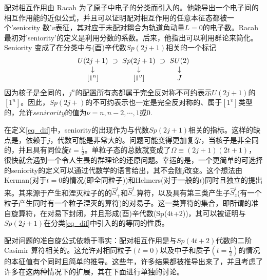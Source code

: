 配对相互作用由 Racah 为了原子中电子的分类而引入的。他能导出一个电子间的相互作用能的近似公式，并且可以证明配对相互作用的任意本征态都被一个'seniority 数'$v$表征，其对应于未配对耦合为轨道角动量$L=0$的电子数。Racah 最初对'seniority'的定义是利用分数的系数。后来，他指出可以利用群论来简化。Seniority 变成了在分类中与(酉)辛代数$Sp(2j+1)$相关的一个标记
\begin{equation}\label{eq_dif}
{\setlength\arraycolsep{3pt}\renewcommand{\arraystretch}{1}
\begin{array}{ccccc}
U(2j+1)&\supset&Sp(2j+1)&\supset&SU(2)\\
\downarrow& &\downarrow& &\downarrow\\
\textrm{[}1^{n}\textrm{]}& &[1^\upsilon]& &J
\end{array}}
\end{equation}
因为核子是全同的，$j^n$的配置所有态都属于完全反对称不可约表示$U(2j+1)$的$[1^n]$。因此，$Sp(2j+)$的不可约表示也一定是完全反对称的、属于$[1^\upsilon]$类型的，允许$senirority$的值为$\nu=n,n-2,\cdots,1$或0.

在定义\ref{eq_dif}中，seniority的出现作为与代数$Sp(2j+1)$相关的指标。这样的缺点是，依赖于$j$，代数可能是非常大的。问题可能变得更加复杂，当核子是非全同的，并且具有同位旋$t=\frac{1}{2}$。单粒子态的总数就变成了$\Omega\equiv(2j+1)(2t+1)$，很快就会遇到一个令人生畏的群理论的还原问题。幸运的是，一个更简单的可选择的seniority的定义可以通过代数学的语言给出，其不会随$j$改变。这个想法由Kerman(对于$t=0$的情况(即全同粒子))和Helmers(对于一般的$t$)同时且独立的提出来。其来源于产生和湮灭粒子的的$\widehat{S}_+^j$和$\widehat{S}_-^j$算符，以及具有第三类产生子$\widehat{S}^j_z$(有一个粒子产生同时有一个粒子湮灭的算符)的对易子。这一类算符的集合，即所谓的准自旋算符，在对易下封闭，并且形成(酉)辛代数(Sp(4t+2))，其可以被证明与$Sp(2j+1)$在分类\ref{eq_dif}中引入的的等同的性质。

配对问题的准自旋公式依赖于事实：配对相互作用是与$Sp(4t+2)$代数的二阶 Casimir 算符相关的。这允许对相同粒子$(t=0)$以及中子和质子$(t=\frac{1}{2})$的情况的本征值有个同时且简单的推导。这些年，许多结果都被推导出来了，并且考虑了许多在这两种情况下的扩展，其在下面进行单独的讨论。
